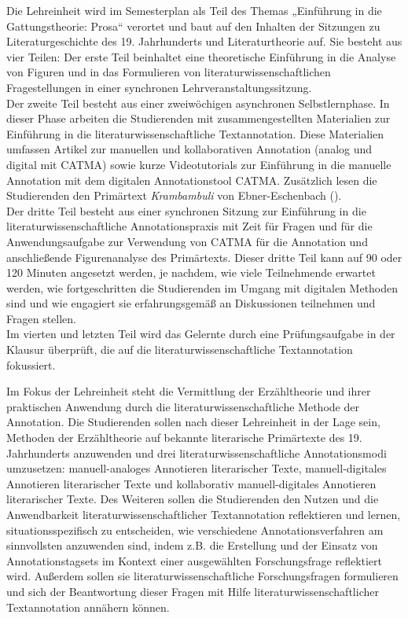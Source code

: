 \documentclass[
          a4paper,
        ]{article}
\begin{document}
Die Lehreinheit wird im Semesterplan als Teil des Themas „Einführung in
die Gattungstheorie: Prosa`` verortet und baut auf den Inhalten der
Sitzungen zu Literaturgeschichte des 19. Jahrhunderts und
Literaturtheorie auf. Sie besteht aus vier Teilen: Der erste Teil
beinhaltet eine theoretische Einführung in die Analyse von Figuren und
in das Formulieren von literaturwissenschaftlichen Fragestellungen in
einer synchronen Lehrveranstaltungssitzung.\\
Der zweite Teil besteht aus einer zweiwöchigen asynchronen
Selbstlernphase. In dieser Phase arbeiten die Studierenden mit
zusammengestellten Materialien zur Einführung in die
literaturwissenschaftliche Textannotation. Diese Materialien umfassen
Artikel zur manuellen und kollaborativen Annotation (analog und digital
mit CATMA) sowie kurze Videotutorials zur Einführung in die manuelle
Annotation mit dem digitalen Annotationstool CATMA. Zusätzlich lesen die
Studierenden den Primärtext \emph{Krambambuli} von Ebner-Eschenbach
().\\
Der dritte Teil besteht aus einer synchronen Sitzung zur Einführung in
die literaturwissenschaftliche Annotationspraxis mit Zeit für Fragen und
für die Anwendungsaufgabe zur Verwendung von CATMA für die Annotation
und anschließende Figurenanalyse des Primärtexts. Dieser dritte Teil
kann auf 90 oder 120 Minuten angesetzt werden, je nachdem, wie viele
Teilnehmende erwartet werden, wie fortgeschritten die Studierenden im
Umgang mit digitalen Methoden sind und wie engagiert sie erfahrungsgemäß
an Diskussionen teilnehmen und Fragen stellen.\\
Im vierten und letzten Teil wird das Gelernte durch eine Prüfungsaufgabe
in der Klausur überprüft, die auf die literaturwissenschaftliche
Textannotation fokussiert.

Im Fokus der Lehreinheit steht die Vermittlung der Erzähltheorie und
ihrer praktischen Anwendung durch die literaturwissenschaftliche Methode
der Annotation. Die Studierenden sollen nach dieser Lehreinheit in der
Lage sein, Methoden der Erzähltheorie auf bekannte literarische
Primärtexte des 19. Jahrhunderts anzuwenden und drei
literaturwissenschaftliche Annotationsmodi umzusetzen: manuell-analoges
Annotieren literarischer Texte, manuell-digitales Annotieren
literarischer Texte und kollaborativ manuell-digitales Annotieren
literarischer Texte. Des Weiteren sollen die Studierenden den Nutzen und
die Anwendbarkeit literaturwissenschaftlicher Textannotation
reflektieren und lernen, situationsspezifisch zu entscheiden, wie
verschiedene Annotationsverfahren am sinnvollsten anzuwenden sind, indem
z.B. die Erstellung und der Einsatz von Annotationstagsets im Kontext
einer ausgewählten Forschungsfrage reflektiert wird. Außerdem sollen sie
literaturwissenschaftliche Forschungsfragen formulieren und sich der
Beantwortung dieser Fragen mit Hilfe literaturwissenschaftlicher
Textannotation annähern können.
\end{document}
